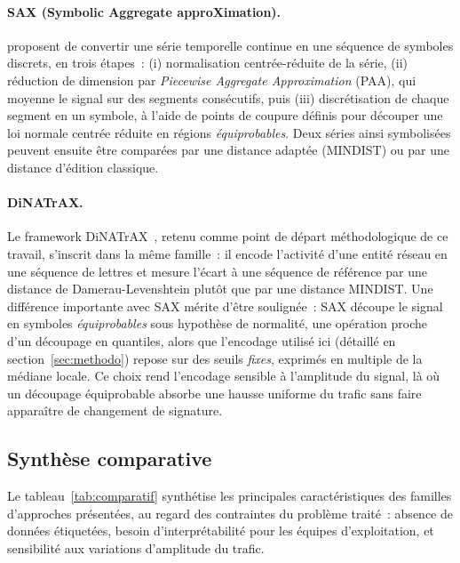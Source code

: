 \paragraph{SAX (Symbolic Aggregate approXimation).}
\textcite{lin2007experiencing} proposent de convertir une série
temporelle continue en une séquence de symboles discrets, en trois
étapes~: (i) normalisation centrée-réduite de la série, (ii)
réduction de dimension par \emph{Piecewise Aggregate Approximation}
(PAA), qui moyenne le signal sur des segments consécutifs, puis (iii)
discrétisation de chaque segment en un symbole, à l'aide de points de
coupure définis pour découper une loi normale centrée réduite en
régions \emph{équiprobables}. Deux séries ainsi symbolisées peuvent
ensuite être comparées par une distance adaptée (MINDIST) ou par une
distance d'édition classique.

\paragraph{DiNATrAX.}
Le framework DiNATrAX~\parencite{maudoux2024dinatrax}, retenu comme
point de départ méthodologique de ce travail, s'inscrit dans la même
famille~: il encode l'activité d'une entité réseau en une séquence de
lettres et mesure l'écart à une séquence de référence par une
distance de Damerau-Levenshtein plutôt que par une distance MINDIST.
Une différence importante avec SAX mérite d'être soulignée~: SAX
découpe le signal en symboles \emph{équiprobables} sous hypothèse de
normalité, une opération proche d'un découpage en quantiles, alors
que l'encodage utilisé ici (détaillé en section~\ref{sec:methodo})
repose sur des seuils \emph{fixes}, exprimés en multiple de la
médiane locale. Ce choix rend l'encodage sensible à l'amplitude du
signal, là où un découpage équiprobable absorbe une hausse uniforme du
trafic sans faire apparaître de changement de signature.

\subsection{Synthèse comparative}

Le tableau~\ref{tab:comparatif} synthétise les principales
caractéristiques des familles d'approches présentées, au regard des
contraintes du problème traité~: absence de données étiquetées,
besoin d'interprétabilité pour les équipes d'exploitation, et
sensibilité aux variations d'amplitude du trafic.


